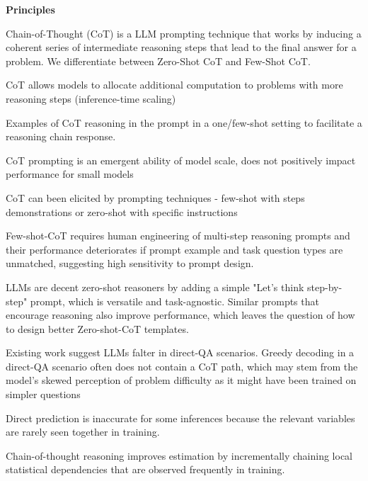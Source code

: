 \textbf{Principles}

Chain-of-Thought (CoT) is a LLM prompting technique that works by inducing a coherent series of intermediate 
reasoning steps that lead to the final answer for a problem\cite{wei2023chainofthoughtpromptingelicitsreasoning}.
We differentiate between Zero-Shot CoT\cite{NEURIPS2022_8bb0d291} and Few-Shot CoT\cite{wei2023chainofthoughtpromptingelicitsreasoning}.

CoT allows models to allocate additional computation to problems with more reasoning steps (inference-time scaling) \cite{wei2023chainofthoughtpromptingelicitsreasoning}


Examples of CoT reasoning in the prompt in a one/few-shot setting to facilitate a reasoning chain response. \cite{wei2023chainofthoughtpromptingelicitsreasoning}

CoT prompting is an emergent ability of model scale, does not positively impact performance for small models \cite{wei2023chainofthoughtpromptingelicitsreasoning}

CoT can been elicited by prompting techniques - few-shot with steps demonstrations or zero-shot with specific instructions \cite{wang2024chainofthoughtreasoningprompting}

Few-shot-CoT requires human engineering of multi-step reasoning prompts and their performance deteriorates if prompt example and task question types are unmatched, suggesting high sensitivity to prompt design. \cite{NEURIPS2022_8bb0d291}

LLMs are decent zero-shot reasoners by adding a simple "Let's think step-by-step" prompt, which is versatile and task-agnostic. Similar prompts that encourage reasoning also improve performance, which leaves the question of how to design better Zero-shot-CoT templates. \cite{NEURIPS2022_8bb0d291}

Existing work suggest LLMs falter in direct-QA scenarios.  \cite{wang2024chainofthoughtreasoningprompting}
Greedy decoding in a direct-QA scenario often does not contain a CoT path, which may stem from the model's skewed perception of problem difficulty as it might have been trained on simpler questions \cite{wang2024chainofthoughtreasoningprompting}

Direct prediction is inaccurate for some inferences because the relevant variables are rarely seen together in training. \cite{prystawski2023thinkstepstepreasoning}

Chain-of-thought reasoning improves estimation by incrementally chaining local statistical dependencies that are observed frequently in training. \cite{prystawski2023thinkstepstepreasoning}

